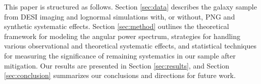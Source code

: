 This paper is structured as follows. Section \ref{sec:data} describes the galaxy sample from DESI imaging and lognormal simulations with, or without, PNG and synthetic systematic effects. Section \ref{sec:method} outlines the theoretical framework for modeling the angular power spectrum, strategies for handling various observational and theoretical systematic effects, and statistical techniques for measuring the significance of remaining systematics in our sample after mitigation. Our results are presented in Section \ref{sec:results}, and Section \ref{sec:conclusion} summarizes our conclusions and directions for future work.